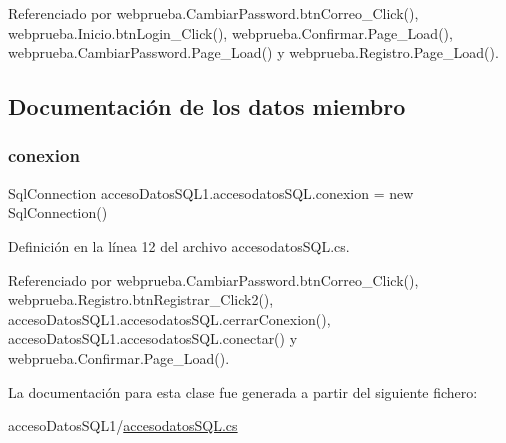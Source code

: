 Referenciado por webprueba.\+Cambiar\+Password.\+btn\+Correo\+\_\+\+Click(), webprueba.\+Inicio.\+btn\+Login\+\_\+\+Click(), webprueba.\+Confirmar.\+Page\+\_\+\+Load(), webprueba.\+Cambiar\+Password.\+Page\+\_\+\+Load() y webprueba.\+Registro.\+Page\+\_\+\+Load().



\subsection{Documentación de los datos miembro}
\mbox{\label{classacceso_datos_s_q_l1_1_1accesodatos_s_q_l_a1932eb53bebc0d2002cc3c40e21f9385}} 
\subsubsection{\texorpdfstring{conexion}{conexion}}
{\footnotesize\ttfamily Sql\+Connection acceso\+Datos\+S\+Q\+L1.\+accesodatos\+S\+Q\+L.\+conexion = new Sql\+Connection()}



Definición en la línea 12 del archivo accesodatos\+S\+Q\+L.\+cs.



Referenciado por webprueba.\+Cambiar\+Password.\+btn\+Correo\+\_\+\+Click(), webprueba.\+Registro.\+btn\+Registrar\+\_\+\+Click2(), acceso\+Datos\+S\+Q\+L1.\+accesodatos\+S\+Q\+L.\+cerrar\+Conexion(), acceso\+Datos\+S\+Q\+L1.\+accesodatos\+S\+Q\+L.\+conectar() y webprueba.\+Confirmar.\+Page\+\_\+\+Load().



La documentación para esta clase fue generada a partir del siguiente fichero\+:\begin{DoxyCompactItemize}
\item 
acceso\+Datos\+S\+Q\+L1/\mbox{\hyperlink{acceso_datos_s_q_l1_2accesodatos_s_q_l_8cs}{accesodatos\+S\+Q\+L.\+cs}}\end{DoxyCompactItemize}
